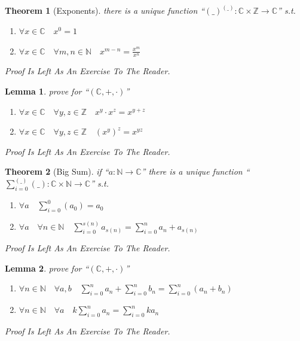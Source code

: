 \documentclass[10pt,a4paper]{book}
\newtheorem{theorem}{Theorem}[section]
\newtheorem{lemma}{Lemma}[section]
\begin{document}
\begin{theorem}[Exponents] there is a unique function ``$(\_)^{(\_)} :\mathbb{C} \times \mathbb{Z} \to \mathbb{C}$'' s.t.

    \begin{enumerate}
        \setlength{\itemsep}{0pt} %
        \item       $\forall x \in \mathbb{C} \quad x ^ 0 = 1$
        \item       $\forall x \in \mathbb{C} \quad \forall m ,n  \in \mathbb{N} \quad  x ^ {m-n} = \frac{x ^ m}{x^n}    $
    \end{enumerate}
    Proof Is Left As An Exercise To The Reader.
\end{theorem}

\begin{lemma}prove for ``$(\mathbb{C} , + , \cdot  )$''
    \begin{enumerate}
        \setlength{\itemsep}{0pt} %
        \item       $\forall x   \in \mathbb{C} \quad \forall y ,z  \in \mathbb{Z} \quad  x^y  \cdot  x^z = x^{y  + z}  $
        \item       $\forall x   \in \mathbb{C} \quad \forall y ,z  \in \mathbb{Z} \quad (x^y)^z = x^{y z}  $
    \end{enumerate}
    Proof Is Left As An Exercise To The Reader.
\end{lemma}

\begin{theorem}[Big Sum] if ``$a : \mathbb{N} \to \mathbb{C}$'' there is a unique function ``$\sum_{i = 0}^{(\_)} (\_)  :\mathbb{C} \times \mathbb{N} \to \mathbb{C}$'' s.t.

    \begin{enumerate}
        \setlength{\itemsep}{0pt} %
        \item       $\forall a \quad  \sum_{i = 0}^{0} (a_0)  = a_0$
        \item       $\forall a \quad \forall n \in \mathbb{N} \quad  \sum_{i = 0}^{s(n)} a_{s(n)} = \sum_{i = 0}^{n} a_n + a_{s(n)}  $
    \end{enumerate}
    Proof Is Left As An Exercise To The Reader.
\end{theorem}

\begin{lemma}prove for ``$(\mathbb{C} , + , \cdot  )$''
    \begin{enumerate}
        \setlength{\itemsep}{0pt} %
        \item       $\forall n   \in \mathbb{N} \quad \forall a , b   \quad  \sum_{i = 0}^n a_n + \sum_{i = 0}^n b_n = \sum_{i = 0}^n (a_n + b_n )  $
        \item       $\forall n   \in \mathbb{N} \quad \forall a   \quad k \sum_{i = 0}^n a_n = \sum_{i = 0}^n ka_n $
    \end{enumerate}
    Proof Is Left As An Exercise To The Reader.
\end{lemma}
\end{document}
